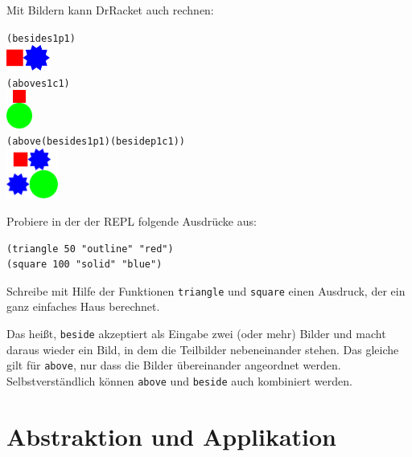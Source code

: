 %
Mit Bildern kann DrRacket auch rechnen:
%
\begin{alltt}
(beside s1 p1)
\evalsto{} \includegraphics[height=24pt]{i1prog/beside.png}
(above s1 c1)
\evalsto{} \includegraphics[width=24pt]{i1prog/above.png}
(above (beside s1 p1) (beside p1 c1))
\evalsto{} \includegraphics[width=48pt]{i1prog/abovebeside.png}
\end{alltt}
%
\begin{aufgabe}
  Probiere in der der REPL folgende Ausdrücke aus:
\begin{verbatim}
(triangle 50 "outline" "red")
(square 100 "solid" "blue")
\end{verbatim}
  Schreibe mit Hilfe der Funktionen \texttt{triangle} und
  \texttt{square} einen Ausdruck, der ein ganz einfaches Haus
  berechnet.
\end{aufgabe}
%
Das heißt, \texttt{beside} akzeptiert als Eingabe zwei (oder mehr)
Bilder und macht daraus wieder ein Bild, in dem die Teilbilder
nebeneinander stehen.  Das gleiche gilt für \texttt{above}, nur dass
die Bilder übereinander angeordnet werden.  Selbstverständlich können
\texttt{above} und \texttt{beside} auch kombiniert werden.

\section{Abstraktion und Applikation}
\label{sec:abstraktion-und-applikation}

